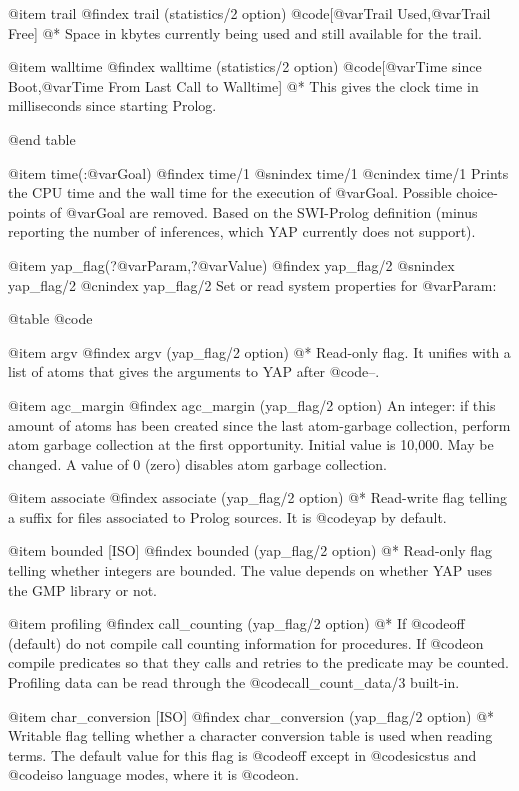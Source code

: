 {{{{{{{@item trail
@findex trail (statistics/2 option)
@code{[@var{Trail Used},@var{Trail Free}]}
@*
Space in kbytes currently being used and still available for the trail.

@item walltime
@findex walltime (statistics/2 option)
@code{[@var{Time since Boot},@var{Time From Last Call to Walltime}]}
@* 
This gives the clock time in milliseconds since starting Prolog.

@end table

@item time(:@var{Goal})
@findex time/1
@snindex time/1
@cnindex time/1
Prints the CPU time and the wall time for the execution of @var{Goal}.
Possible choice-points of @var{Goal} are removed. Based on the SWI-Prolog 
definition (minus reporting the number of inferences, which YAP currently
does not support).

@item yap_flag(?@var{Param},?@var{Value})
@findex yap_flag/2
@snindex yap_flag/2
@cnindex yap_flag/2
Set or read system properties for @var{Param}:

@table @code

@item argv
@findex argv (yap_flag/2 option)
@* Read-only flag. It unifies with a list of atoms that gives the
arguments to YAP after @code{--}.

@item agc_margin
@findex agc_margin (yap_flag/2 option)
An integer: if this amount of atoms has been created since the last
atom-garbage collection, perform atom garbage collection at the first
opportunity. Initial value is 10,000. May be changed. A value of 0
(zero) disables atom garbage collection.

@item associate
@findex associate (yap_flag/2 option)
@*
Read-write flag telling a suffix for files associated to Prolog
sources. It is @code{yap} by default.

@item bounded [ISO]
@findex bounded (yap_flag/2 option)
@*
Read-only flag telling whether integers are bounded. The value depends
on whether YAP uses the GMP library or not.

@item  profiling
@findex call_counting (yap_flag/2 option)
@*
If @code{off} (default) do not compile call counting information for
procedures. If @code{on} compile predicates so that they calls and
retries to the predicate may be counted. Profiling data can be read through the
@code{call_count_data/3} built-in.

@item char_conversion [ISO]
@findex  char_conversion (yap_flag/2 option)
@*
Writable flag telling whether a character conversion table is used when
reading terms. The default value for this flag is @code{off} except in
@code{sicstus} and @code{iso} language modes, where it is @code{on}.

}}}}}}}
